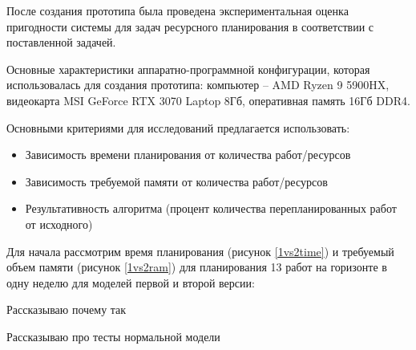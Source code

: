 После создания прототипа была проведена экспериментальная оценка пригодности системы для задач ресурсного планирования в соответствии с поставленной задачей.

Основные характеристики аппаратно-программной конфигурации, которая использовалась для создания прототипа: компьютер – AMD Ryzen 9 5900HX, видеокарта MSI GeForce RTX 3070 Laptop 8Гб, оперативная память 16Гб DDR4.

Основными критериями для исследований предлагается использовать:
\begin{itemize}
    \item Зависимость времени планирования от количества работ/ресурсов
    \item Зависимость требуемой памяти от количества работ/ресурсов
    \item Результативность алгоритма (процент количества перепланированных работ от исходного)
\end{itemize}

Для начала рассмотрим время планирования (рисунок \ref{1vs2time}) и требуемый объем памяти (рисунок \ref{1vs2ram}) для планирования 13 работ на горизонте в одну неделю для моделей первой и второй версии:



Рассказываю почему так

Рассказываю про тесты нормальной модели

\clearpage
